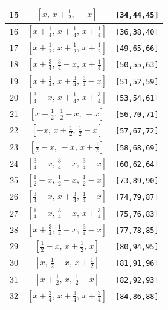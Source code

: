 \documentclass[fleqn,8pt]{jsarticle}
\begin{document}
\begin{longtable}{ccc}
15 & $\left[ x,\, x + \frac{1}{2},\, - x \right]$ & {\tt [34,44,45]} \\ \hline
16 & $\left[ x + \frac{1}{4},\, x + \frac{1}{4},\, x + \frac{1}{4} \right]$ & {\tt [36,38,40]} \\ \hline
17 & $\left[ x + \frac{1}{2},\, x + \frac{1}{2},\, x + \frac{1}{2} \right]$ & {\tt [49,65,66]} \\ \hline
18 & $\left[ x + \frac{3}{4},\, \frac{3}{4} - x,\, x + \frac{1}{4} \right]$ & {\tt [50,55,63]} \\ \hline
19 & $\left[ x + \frac{1}{4},\, x + \frac{3}{4},\, \frac{3}{4} - x \right]$ & {\tt [51,52,59]} \\ \hline
20 & $\left[ \frac{3}{4} - x,\, x + \frac{1}{4},\, x + \frac{3}{4} \right]$ & {\tt [53,54,61]} \\ \hline
21 & $\left[ x + \frac{1}{2},\, \frac{1}{2} - x,\, - x \right]$ & {\tt [56,70,71]} \\ \hline
22 & $\left[ - x,\, x + \frac{1}{2},\, \frac{1}{2} - x \right]$ & {\tt [57,67,72]} \\ \hline
23 & $\left[ \frac{1}{2} - x,\, - x,\, x + \frac{1}{2} \right]$ & {\tt [58,68,69]} \\ \hline
24 & $\left[ \frac{3}{4} - x,\, \frac{3}{4} - x,\, \frac{3}{4} - x \right]$ & {\tt [60,62,64]} \\ \hline
25 & $\left[ \frac{1}{2} - x,\, \frac{1}{2} - x,\, \frac{1}{2} - x \right]$ & {\tt [73,89,90]} \\ \hline
26 & $\left[ \frac{3}{4} - x,\, x + \frac{3}{4},\, \frac{1}{4} - x \right]$ & {\tt [74,79,87]} \\ \hline
27 & $\left[ \frac{1}{4} - x,\, \frac{3}{4} - x,\, x + \frac{3}{4} \right]$ & {\tt [75,76,83]} \\ \hline
28 & $\left[ x + \frac{3}{4},\, \frac{1}{4} - x,\, \frac{3}{4} - x \right]$ & {\tt [77,78,85]} \\ \hline
29 & $\left[ \frac{1}{2} - x,\, x + \frac{1}{2},\, x \right]$ & {\tt [80,94,95]} \\ \hline
30 & $\left[ x,\, \frac{1}{2} - x,\, x + \frac{1}{2} \right]$ & {\tt [81,91,96]} \\ \hline
31 & $\left[ x + \frac{1}{2},\, x,\, \frac{1}{2} - x \right]$ & {\tt [82,92,93]} \\ \hline
32 & $\left[ x + \frac{3}{4},\, x + \frac{3}{4},\, x + \frac{3}{4} \right]$ & {\tt [84,86,88]} \\
\end{longtable}
\renewcommand{\arraystretch}{1.2}
\end{document}
